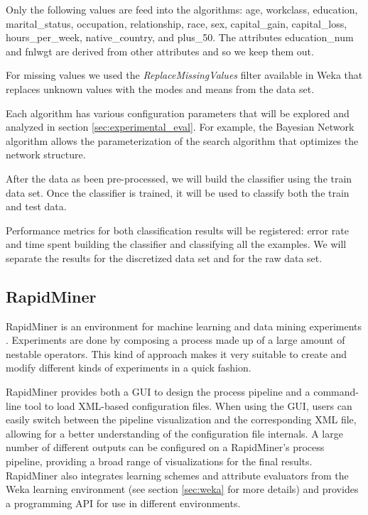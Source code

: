 \documentclass[a4paper]{llncs}
\begin{document}
Only the following values are feed into the algorithms: age, workclass, education,
marital\_status, occupation, relationship, race, sex, capital\_gain, capital\_loss,
hours\_per\_week, native\_country, and plus\_50. The attributes education\_num
and fnlwgt are derived from other attributes and so we keep them out.

For missing values we used the \textit{ReplaceMissingValues} filter available in Weka that
replaces unknown values with the modes and means from the data set. 

Each algorithm has various configuration parameters that will be explored
and analyzed in section \ref{sec:experimental_eval}.
For example, the Bayesian Network
algorithm allows the parameterization of the search algorithm that optimizes the network structure.

After the data as been pre-processed,
we will build the classifier using the train data set.
Once the classifier is trained, it will be used to classify both the train and test data.

Performance metrics for both classification results will be registered: error rate and time spent
building the classifier and classifying all the examples.
We will separate the results for the discretized data set and for the raw data set.

\subsection{RapidMiner}

RapidMiner is an environment for machine learning and data mining experiments 
\cite{4}. Experiments are done by composing a process made up of a large amount
of nestable operators. This kind of approach makes it very suitable to create
and modify different kinds of experiments in a quick fashion.

RapidMiner provides both a GUI to design the process pipeline and a command-line
tool to load XML-based configuration files. When using the GUI, users can easily
switch between the pipeline visualization and the corresponding XML file,
allowing for a better understanding of the configuration file internals. A large
number of different outputs can be configured on a RapidMiner's process 
pipeline, providing a broad range of visualizations for the final results.
RapidMiner also integrates learning schemes and attribute evaluators from the 
Weka \cite{weka} learning environment (see section \ref{sec:weka} for more 
details) and provides a programming API for use in different environments.
\end{document}
